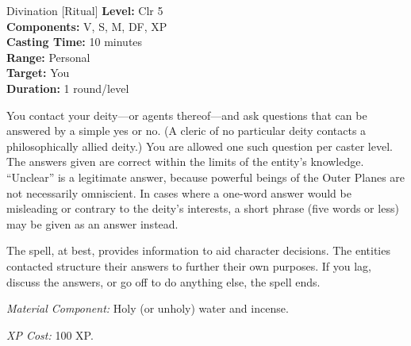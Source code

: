 {Divination [Ritual]}
{
	\textbf{Level:}
	Clr 5\\
	\textbf{Components:}
	V, S, M, DF, XP\\
	\textbf{Casting Time:}
	10 minutes\\
	\textbf{Range:}
	Personal\\
	\textbf{Target:}
	You\\
	\textbf{Duration:}
	1 round/level\\
}
{
	You contact your deity---or agents thereof---and ask questions that can be answered by a simple yes or no. (A cleric of no particular deity contacts a philosophically allied deity.) You are allowed one such question per caster level. The answers given are correct within the limits of the entity's knowledge. ``Unclear'' is a legitimate answer, because powerful beings of the Outer Planes are not necessarily omniscient. In cases where a one-word answer would be misleading or contrary to the deity's interests, a short phrase (five words or less) may be given as an answer instead.

	The spell, at best, provides information to aid character decisions. The entities contacted structure their answers to further their own purposes. If you lag, discuss the answers, or go off to do anything else, the spell ends.

	\textit{Material Component:}
	Holy (or unholy) water and incense.

	\textit{XP Cost:}
	100 XP.

}
